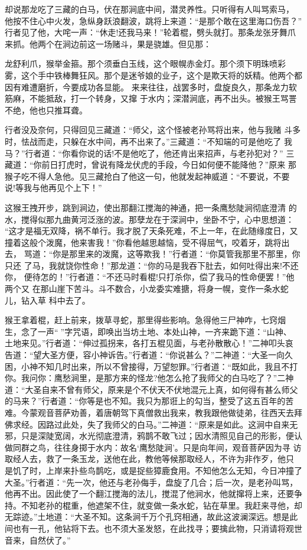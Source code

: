 却说那龙吃了三藏的白马，伏在那涧底中间，潜灵养性。只听得有人叫骂索马，
他按不住心中火发，急纵身跃浪翻波，跳将上来道：“是那个敢在这里海口伤吾？”
行者见了他，大咤一声：“休走!还我马来！”轮着棍，劈头就打。那条龙张牙舞爪
来抓。他两个在涧边前这一场赌斗，果是骁雄。但见那：

龙舒利爪，猴举金箍。那个须垂白玉线，这个眼幌赤金灯。那个须下明珠喷彩
雾，这个手中铁棒舞狂风。那个是迷爷娘的业子，这个是欺天将的妖精。他两个都
因有难遭磨折，今要成功各显能。
来来往往，战罢多时，盘旋良久，那条龙力软筋麻，不能抵敌，打一个转身，又撺
于水内；深潜涧底，再不出头。被猴王骂詈不绝，他也只推耳聋。

行者没及奈何，只得回见三藏道：“师父，这个怪被老孙骂将出来，他与我赌
斗多时，怯战而走，只躲在水中间，再不出来了。”三藏道：“不知端的可是他吃了
我马？”行者道：“你看你说的话!不是他吃了，他还肯出来招声，与老孙犯对？”
三藏道：“你前日打虎时，曾说有降龙伏虎的手段，今日如何便不能降他？”原来
那猴子吃不得人急他。见三藏抢白了他这一句，他就发起神威道：“不要说，不要
说!等我与他再见个上下！”

这猴王拽开步，跳到涧边，使出那翻江搅海的神通，把一条鹰愁陡涧彻底澄清
的水，搅得似那九曲黄河泛涨的波。那孽龙在于深涧中，坐卧不宁，心中思想道：
“这才是福无双降，祸不单行。我才脱了天条死难，不上一年，在此随缘度日，又
撞着这般个泼魔，他来害我！”你看他越思越恼，受不得屈气，咬着牙，跳将出去，
骂道：“你是那里来的泼魔，这等欺我！”行者道：“你莫管我那里不那里，你只还
了马，我就饶你性命！”那龙道：“你的马是我吞下肚去，如何吐得出来!不还你，
便待怎的！”行者道：“不还马时看棍!只打杀你，偿了我马的性命便罢！”他两个又
在那山崖下苦斗。斗不数合，小龙委实难搪，将身一幌，变作一条水蛇儿，钻入草
科中去了。

猴王拿着棍，赶上前来，拨草寻蛇，那里得些影响。急得他三尸神咋，七窍烟
生，念了一声“”字咒语，即唤出当坊土地、本处山神，一齐来跪下道：“山神、
土地来见。”行者道：“伸过孤拐来，各打五棍见面，与老孙散散心！”二神叩头哀
告道：“望大圣方便，容小神诉告。”行者道：“你说甚么？”二神道：“大圣一向久
困，小神不知几时出来，所以不曾接得，万望恕罪。”行者道：“既如此，我且不打
你。我问你：鹰愁涧里，是那方来的怪龙?他怎么抢了我师父的白马吃了？”二神
道：“大圣自来不曾有师父，原来是个不伏天不伏地混元上真，如何得有甚么师父
的马来？”行者道：“你等是也不知。我只为那诳上的勾当，整受了这五百年的苦
难。今蒙观音菩萨劝善，着唐朝驾下真僧救出我来，教我跟他做徒弟，往西天去拜
佛求经。因路过此处，失了我师父的白马。”二神道：“原来是如此。这涧中自来无
邪，只是深陡宽阔，水光彻底澄清，鸦鹊不敢飞过；因水清照见自己的形影，便认
做同群之鸟，往往身掷于水内：故名‘鹰愁陡涧’。只是向年间，观音菩萨因为寻
访取经人去，救了一条玉龙，送他在此，教他等候那取经人，不许为非作歹，他只
是饥了时，上岸来扑些鸟鹊吃，或是捉些獐鹿食用。不知他怎么无知，今日冲撞了
大圣。”行者道：“先一次，他还与老孙侮手，盘旋了几合；后一次，是老孙叫骂，
他再不出。因此使了一个翻江搅海的法儿，搅混了他涧水，他就撺将上来，还要争
持。不知老孙的棍重，他遮架不住，就变做一条水蛇，钻在草里。我赶来寻他，却
无踪迹。”土地道：“大圣不知。这条涧千万个孔窍相通，故此这波澜深远。想是此
间也有一孔，他钻将下去。也不须大圣发怒，在此找寻；要擒此物，只消请将观世
音来，自然伏了。”

